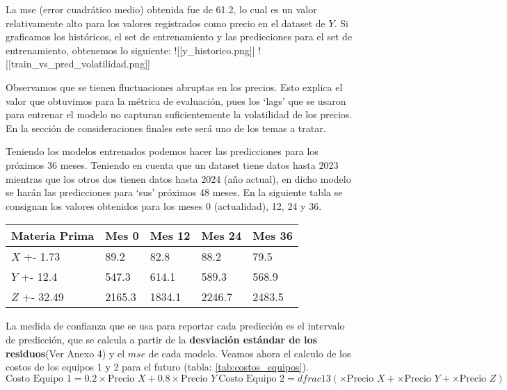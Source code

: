 La mse (error cuadrático medio) obtenida fue de 61.2, lo cual es un
valor relativamente alto para los valores registrados como precio en el
dataset de \(Y\). Si graficamos los históricos, el set de entrenamiento
y las predicciones para el set de entrenamiento, obtenemos lo siguiente:
!{[}{[}y\_historico.png{]}{]}
!{[}{[}train\_vs\_pred\_volatilidad.png{]}{]}

Observamos que se tienen fluctuaciones abruptas en los precios. Esto
explica el valor que obtuvimos para la métrica de evaluación, pues los
`lags' que se usaron para entrenar el modelo no capturan suficientemente
la volatilidad de los precios. En la sección de consideraciones finales
este será uno de los temas a tratar.

Teniendo los modelos entrenados podemos hacer las predicciones para los
próximos 36 meses. Teniendo en cuenta que un dataset tiene datos hasta
2023 mientras que los otros dos tienen datos hasta 2024 (año actual), en
dicho modelo se harán las predicciones para `sus' próximos 48 meses. En
la siguiente tabla se consignan los valores obtenidos para los meses 0
(actualidad), 12, 24 y 36.

\begin{longtable}[]{@{}lllll@{}}
\toprule\noalign{}
Materia Prima & Mes 0 & Mes 12 & Mes 24 & Mes 36 \\
\midrule\noalign{}
\endhead
\bottomrule\noalign{}
\endlastfoot
\(X\) +- 1.73 & 89.2 & 82.8 & 88.2 & 79.5 \\
\(Y\) +- 12.4 & 547.3 & 614.1 & 589.3 & 568.9 \\
\(Z\) +- 32.49 & 2165.3 & 1834.1 & 2246.7 & 2483.5 \\
\end{longtable}

La medida de confianza que se usa para reportar cada predicción es el
intervalo de predicción, que se calcula a partir de la
\textbf{desviación estándar de los residuos}(Ver Anexo 4) y el \(mse\)
de cada modelo. Veamos ahora el calculo de los costos de los equipos 1 y
2 para el futuro (tabla: \ref{tab:costos_equipos}). \[
\text{Costo Equipo 1} = 0.2 \times \text{Precio $X$} + 0.8 \times \text{Precio $Y$}~ \text{Costo Equipo 2} = dfrac{1}{3} (\times \text{Precio $X$} + \times \text{Precio $Y$} + \times \text{Precio $Z$})
\]


